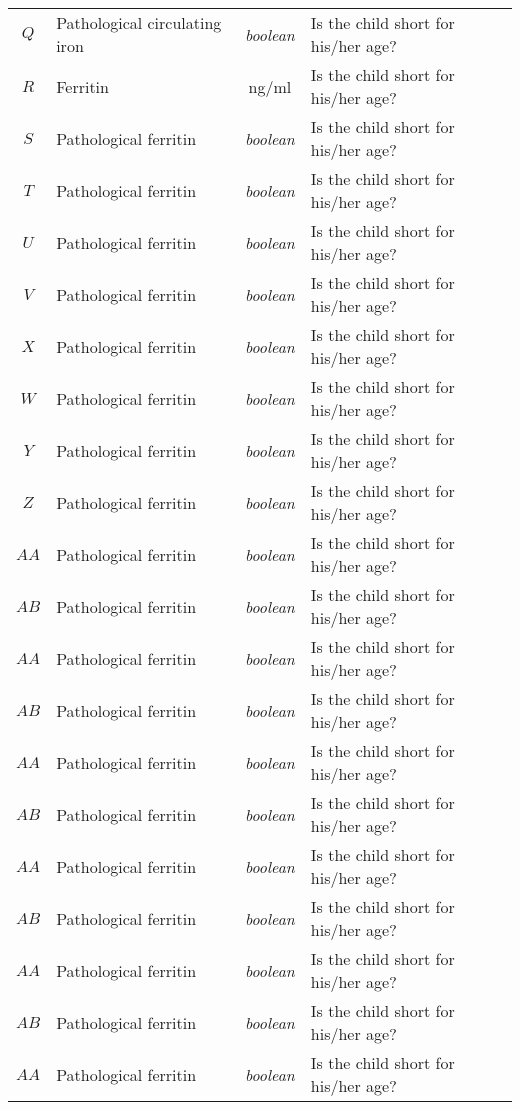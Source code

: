 \begin{footnotesize}
\begin{longtable}{C{.09\mylength} p{.25\mylength} C{.20\mylength} p{.40\mylength}}
	$Q$ & Pathological circulating iron & \textit{boolean} & Is the child short for his/her age?\\
	$R$ & Ferritin & \si{\nano\gram}/\si{\milli\litre} & Is the child short for his/her age?\\
	$S$ & Pathological ferritin & \textit{boolean} & Is the child short for his/her age?\\
	$T$ & Pathological ferritin & \textit{boolean} & Is the child short for his/her age?\\
	$U$ & Pathological ferritin & \textit{boolean} & Is the child short for his/her age?\\
	$V$ & Pathological ferritin & \textit{boolean} & Is the child short for his/her age?\\
	$X$ & Pathological ferritin & \textit{boolean} & Is the child short for his/her age?\\
	$W$ & Pathological ferritin & \textit{boolean} & Is the child short for his/her age?\\
	$Y$ & Pathological ferritin & \textit{boolean} & Is the child short for his/her age?\\
	$Z$ & Pathological ferritin & \textit{boolean} & Is the child short for his/her age?\\
	$AA$ & Pathological ferritin & \textit{boolean} & Is the child short for his/her age?\\
	$AB$ & Pathological ferritin & \textit{boolean} & Is the child short for his/her age?\\
	$AA$ & Pathological ferritin & \textit{boolean} & Is the child short for his/her age?\\
	$AB$ & Pathological ferritin & \textit{boolean} & Is the child short for his/her age?\\
	$AA$ & Pathological ferritin & \textit{boolean} & Is the child short for his/her age?\\
	$AB$ & Pathological ferritin & \textit{boolean} & Is the child short for his/her age?\\
	$AA$ & Pathological ferritin & \textit{boolean} & Is the child short for his/her age?\\
	$AB$ & Pathological ferritin & \textit{boolean} & Is the child short for his/her age?\\
	$AA$ & Pathological ferritin & \textit{boolean} & Is the child short for his/her age?\\
	$AB$ & Pathological ferritin & \textit{boolean} & Is the child short for his/her age?\\
	$AA$ & Pathological ferritin & \textit{boolean} & Is the child short for his/her age?\\

\end{longtable}
\end{footnotesize}
